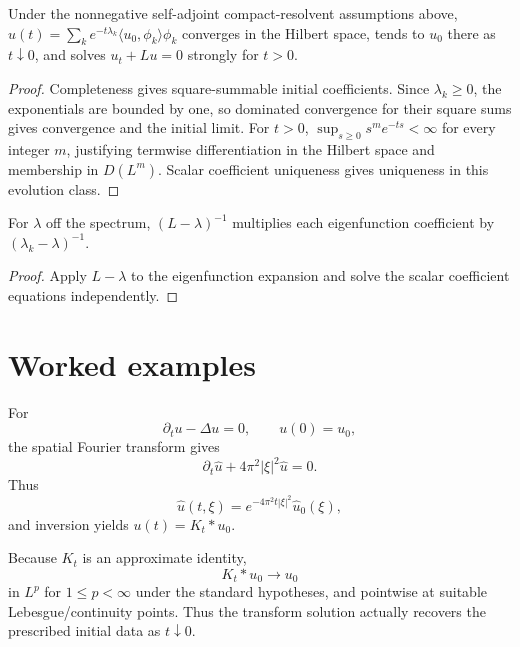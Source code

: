 \begin{theorem}\label{thm:iii28-02}
Under the nonnegative self-adjoint compact-resolvent assumptions above, $u(t)=\sum_ke^{-t\lambda_k}\langle u_0,\phi_k\rangle\phi_k$ converges in the Hilbert space, tends to $u_0$ there as $t\downarrow0$, and solves $u_t+Lu=0$ strongly for $t>0$.
\begin{proof}
Completeness gives square-summable initial coefficients. Since $\lambda_k\ge0$, the exponentials are bounded by one, so dominated convergence for their square sums gives convergence and the initial limit. For $t>0$, $\sup_{s\ge0}s^me^{-ts}<\infty$ for every integer $m$, justifying termwise differentiation in the Hilbert space and membership in $D(L^m)$. Scalar coefficient uniqueness gives uniqueness in this evolution class.
\end{proof}
\end{theorem}

\begin{theorem}\label{thm:iii28-03}
For $\lambda$ off the spectrum, $(L-\lambda)^{-1}$ multiplies each eigenfunction coefficient by $(\lambda_k-\lambda)^{-1}$.
\begin{proof}
Apply $L-\lambda$ to the eigenfunction expansion and solve the scalar coefficient equations independently.
\end{proof}
\end{theorem}

\section{Worked examples}

\begin{example}\label{ex:iii28-worked-01}
For
\[
\partial_tu-\Delta u=0,\qquad u(0)=u_0,
\]
the spatial Fourier transform gives
\[
\partial_t\widehat u+4\pi^2|\xi|^2\widehat u=0.
\]
Thus
\[
\widehat u(t,\xi)=e^{-4\pi^2t|\xi|^2}\widehat u_0(\xi),
\]
and inversion yields \(u(t)=K_t*u_0\).
\end{example}

\begin{example}\label{ex:iii28-worked-02}
Because \(K_t\) is an approximate identity,
\[
K_t*u_0\to u_0
\]
in \(L^p\) for \(1\le p<\infty\) under the standard hypotheses, and pointwise
at suitable Lebesgue/continuity points. Thus the transform solution actually
recovers the prescribed initial data as \(t\downarrow0\).
\end{example}

